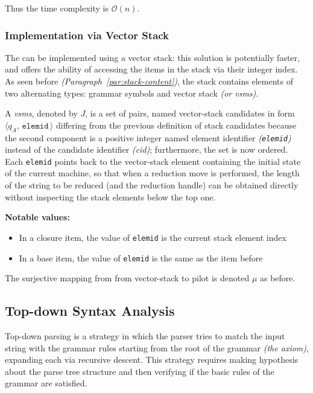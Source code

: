 \documentclass[english]{article}
\begin{document}
Thus the time complexity is \(\mathcal{O}(n)\).

\subsubsection{Implementation via Vector Stack}

The \PDA can be implemented using a vector stack: this solution is potentially faster, and offers the ability of accessing the items in the stack via their integer index.
As seen before \textit{(Paragraph~\ref{par:stack-content})}, the stack contains elements of two alternating types: grammar symbols and vector stack \mstates \textit{(or vsms)}.

A \textit{vsms}, denoted by \(J\), is a set of pairs, named vector-stack candidates in form \(\langle q_A, \, \texttt{elemid} \, \rangle\) differing from the previous definition of stack candidates because the second component is a positive integer named element identifier \textit{(\texttt{elemid})} instead of the candidate identifier \textit{(cid)};
furthermore, the set is now ordered.
Each \texttt{elemid} points back to the vector-stack element containing the initial state of the current machine, so that when a reduction move is performed, the length of the string to be reduced (and the reduction handle) can be obtained directly without inspecting the stack elements below the top one.

\bigskip
\textbf{Notable values:}

\begin{itemize}
  \item In a closure item, the value of \texttt{elemid} is the current stack element index
  \item In a base item, the value of \texttt{elemid} is the same as the item before
\end{itemize}

\bigskip
The surjective mapping from from vector-stack \mstates to pilot \mstates is denoted \(\mu\) as before.

\subsection{Top-down Syntax Analysis}
\label{sec:top-down}

Top-down parsing is a strategy in which the parser tries to match the input string with the grammar rules starting from the root of the grammar \textit{(the axiom)}, expanding each \RP via recursive descent.
This strategy requires making hypothesis about the parse tree structure and then verifying if the basic rules of the grammar are satisfied.
\end{document}
